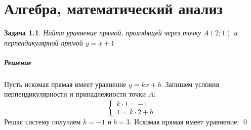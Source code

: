 \documentclass[a4paper,12pt]{report}
\newtheorem{problem}{Задача}[chapter]
\newenvironment{sol}{\paragraph{Решение}}{}
\begin{document}
	
	\newpage
	
	\tableofcontents
	
	\chapter{Алгебра, математический анализ}
	
	\begin{problem}
		Найти уравнение прямой, проходящей через точку $A(2;1)$ и перпендикулярной прямой $y=x+1$
	\end{problem}
	\begin{sol}
		Пусть искомая прямая имеет уравнение $y=kx+b$. Запишем условия перпендикулярности и принадлежности точки $A$:
		\[
		\begin{cases}
			k\cdot 1 = -1\\
			1=k\cdot2 + b
		\end{cases}
		\]
		Решая систему получаем $k=-1$ и $b=3$. Искомая прямая имеет уравнение: 
		\qed
	\end{sol}
	
\end{document}
